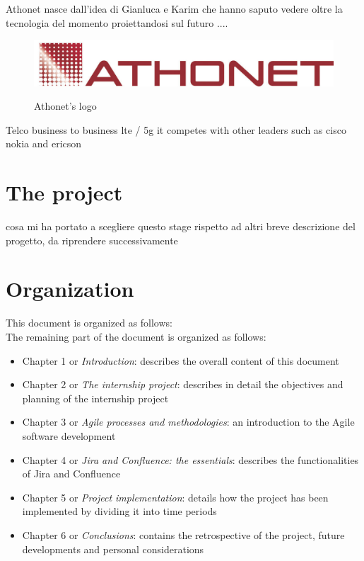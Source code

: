 	Athonet nasce dall'idea di Gianluca e Karim che hanno saputo vedere oltre la tecnologia del momento proiettandosi sul futuro ....
	
	\begin{figure}[H]
		\centering
		\includegraphics[width=.7\textwidth]{resources/ath_logo}\\
		\caption{Athonet's logo}
	\end{figure}
	
	
	Telco
	business to business 
	lte / 5g
	it competes with other leaders such as cisco nokia and ericson	


\section{The project}
	cosa mi ha portato a scegliere questo stage rispetto ad altri
	breve descrizione del progetto, da riprendere successivamente

\section{Organization}
	This document is organized as follows:\\
	The remaining part of the document is organized as follows:
	\begin{itemize}
		\item Chapter 1 or \textit{Introduction}: describes the overall content of this document
		\item Chapter 2 or \textit{The internship project}: describes in detail the objectives and planning of the internship project
		\item Chapter 3 or \textit{Agile processes and methodologies}: an introduction to the Agile software development
		\item Chapter 4 or \textit{Jira and Confluence: the essentials}: describes the functionalities of Jira and Confluence
		\item Chapter 5 or \textit{Project implementation}: details how the project has been implemented by dividing it into time periods
		\item Chapter 6 or \textit{Conclusions}: contains the retrospective of the project, future developments and personal considerations
	\end{itemize}
